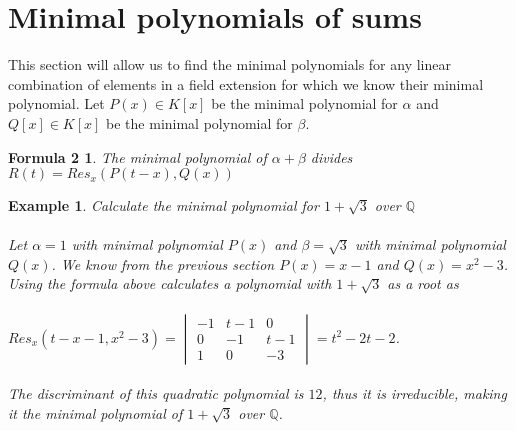 \documentclass{article}
\newtheorem*{Definition: Sylvester Matrix}{Definition}
\newtheorem*{Definition: Resultant 1}{Definition 1}
\newtheorem*{Definition: Resultant 2}{Definition 2}
\newtheorem*{Theorem: Resultant proves shared roots}{Theorem 1}
\newtheorem*{Theorem: Minimal polynomial for beta}{Theorem 2}
\newtheorem*{Example: Sylvester Matrix Ex}{Example}
\newtheorem*{Theorem: Roots}{Theorem}
\newtheorem*{Corollary: Discriminant}{Corollary}
\newtheorem*{Theorem: Rational Root Theorem}{Theorem}
\newtheorem*{Corollary: Cubic Irreducibility}{Corollary}
\newtheorem*{Theorem: Eisenstein Criterion}{Theorem}
\newtheorem*{Theorem: mod p Test}{Theorem}
\newtheorem*{Theorem: Rabin's algorithm}{Theorem}
\newtheorem*{Theorem: gcd finite field}{Theorem}
\newtheorem*{Theorem: Gauss Irreducibles}{Theorem}
\newtheorem*{Theorem: Number of irreducibles}{Theorem}
\newtheorem*{Example: All irreducibles in Z_2}{Example}
\newtheorem*{Formula: Minimal polynomial for r root of a}{Formula 1}
\newtheorem*{Example: minimal polynomial for sqrt(p)}{Example}
\newtheorem*{Example: Golden Ratio}{Example}
\newtheorem*{Formula: Minimal polynomial for a+b}{Formula 2}
\newtheorem*{Example: 1 + sqrt(3)}{Example}
\newtheorem*{Example: cubic root of unity}{Example}
\newtheorem*{Formula: Minimal polynomial for a/b}{Formula 3}
\newtheorem*{Formula: Minimal polynomial for ab}{Formula 4}
\newtheorem*{Example: cubrt(4)/i+1}{Example}
\newtheorem*{Example: 5zeta}{Example}
\newtheorem*{Example: Wild one}{Example}
\begin{document}
\section{Minimal polynomials of sums}

This section will allow us to find the minimal polynomials for any linear combination of elements in a field extension for which we know their minimal polynomial. Let $P(x) \in K[x]$ be the minimal polynomial for $\alpha$ and $Q[x]\in K[x]$ be the minimal polynomial for $\beta$.\\

\begin{Formula: Minimal polynomial for a+b}
The minimal polynomial of $\alpha + \beta$ divides $R(t) = Res_x(P(t-x), Q(x))$
\end{Formula: Minimal polynomial for a+b}

 
\begin{Example: 1 + sqrt(3)}
Calculate the minimal polynomial for $1 + \sqrt{3}$ over $\mathbb{Q}$\\\\
Let $\alpha = 1$ with minimal polynomial $P(x)$ and $\beta = \sqrt{3}$ with minimal polynomial $Q(x)$. We know from the previous section $P(x) = x - 1$ and $Q(x) = x^2-3$. Using the formula above calculates a polynomial with $1 + \sqrt{3}$ as a root as\\\\
 $Res_x(t-x-1, x^2-3) =  \begin{vmatrix} -1 & t-1 & 0 \\ 0 & -1 & t-1\\ 1 & 0 & -3 \end{vmatrix} = t^2-2t-2$.\\\\
The discriminant of this quadratic polynomial is $12$, thus it is irreducible, making it the minimal polynomial of $1+\sqrt{3}$ over $\mathbb{Q}$.
\end{Example: 1 + sqrt(3)}
\end{document}
